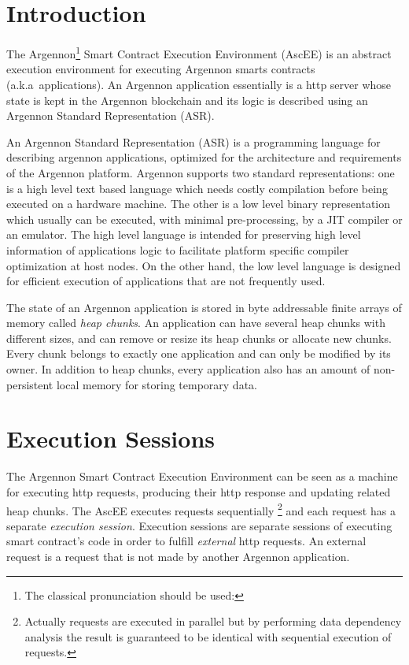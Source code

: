 

\section{Introduction}\label{sec:introduction}

The Argennon\footnote{The classical pronunciation should be used:} Smart Contract Execution
Environment (AscEE) is an abstract execution environment for executing Argennon smarts contracts (a.k.a\ applications).
An Argennon application essentially is a http server whose state is kept in the Argennon blockchain and
its logic is described using an Argennon Standard Representation (ASR).

An Argennon Standard Representation (ASR) is a programming language for describing argennon applications, optimized
for the architecture and requirements of the Argennon platform.
Argennon supports two standard representations: one is a high level text based language which needs
costly compilation before being executed on a hardware machine. The other is a low level binary representation which
usually can be executed, with minimal pre-processing, by a JIT compiler or an emulator. The high level
language is intended for preserving high level information of applications logic to facilitate
platform specific compiler optimization at host nodes. On the other hand, the low level language is designed for
efficient execution of applications that are not frequently used.

The state of an Argennon application is stored in byte addressable finite arrays of memory called
\emph{heap chunks}. An application can have several heap chunks with different sizes, and can remove or
resize its heap chunks or allocate new chunks. Every chunk belongs to exactly one application and can only be modified
by its owner. In addition to heap chunks, every application also has an amount of non-persistent local memory for
storing temporary data.


\section{Execution Sessions}\label{sec:sessions}

The Argennon Smart Contract Execution Environment can be seen as a machine for executing http requests, producing
their http response and updating related heap chunks. The AscEE executes requests sequentially \footnote{Actually
requests are executed in parallel but by performing data dependency analysis the result is guaranteed to be identical
with sequential execution of requests.} and each request has a separate \emph{execution session}. Execution sessions
are separate sessions of executing smart contract's code in order to fulfill \emph{external} http requests. An
external request is a request that is not made by another Argennon application.


